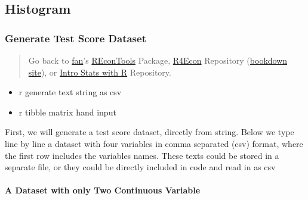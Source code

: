 \documentclass[
]{book}
\providecommand{\tightlist}{%
  \setlength{\itemsep}{0pt}\setlength{\parskip}{0pt}}
\begin{document}
\hypertarget{histogram}{%
\subsection{Histogram}\label{histogram}}

\hypertarget{generate-test-score-dataset}{%
\subsubsection{Generate Test Score Dataset}\label{generate-test-score-dataset}}

\begin{quote}
Go back to \href{http://fanwangecon.github.io/CodeDynaAsset/}{fan}'s \href{https://fanwangecon.github.io/REconTools/}{REconTools} Package, \href{https://fanwangecon.github.io/R4Econ/}{R4Econ} Repository (\href{https://fanwangecon.github.io/R4Econ/bookdown}{bookdown site}), or \href{https://fanwangecon.github.io/Stat4Econ/}{Intro Stats with R} Repository.
\end{quote}

\begin{itemize}
\tightlist
\item
  r generate text string as csv
\item
  r tibble matrix hand input
\end{itemize}

First, we will generate a test score dataset, directly from string. Below we type line by line a dataset with four variables in comma separated (csv) format, where the first row includes the variables names. These texts could be stored in a separate file, or they could be directly included in code and read in as csv

\hypertarget{a-dataset-with-only-two-continuous-variable}{%
\paragraph{A Dataset with only Two Continuous Variable}\label{a-dataset-with-only-two-continuous-variable}}
\end{document}
